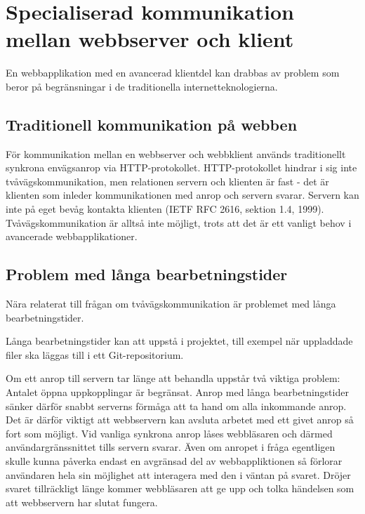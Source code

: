 \section{Specialiserad kommunikation mellan webbserver och klient}

En webbapplikation med en avancerad klientdel kan drabbas av problem som beror på begränsningar i de traditionella internetteknologierna.

\subsection{Traditionell kommunikation på webben}

För kommunikation mellan en webbserver och webbklient används traditionellt synkrona envägsanrop via HTTP-protokollet. HTTP-protokollet hindrar i sig inte tvåvägskommunikation, men relationen servern och klienten är fast - det är klienten som inleder kommunikationen med anrop och servern svarar. Servern kan inte på eget bevåg kontakta klienten (IETF RFC 2616, sektion 1.4, 1999). Tvåvägskommunikation är alltså inte möjligt, trots att det är ett vanligt behov i avancerade webbapplikationer.

\subsection{Problem med långa bearbetningstider}

Nära relaterat till frågan om tvåvägskommunikation är problemet med långa bearbetningstider.

Långa bearbetningstider kan att uppstå i projektet, till exempel när uppladdade filer ska läggas till i ett Git-repositorium. 

Om ett anrop till servern tar länge att behandla uppstår två viktiga problem:
Antalet öppna uppkopplingar är begränsat. Anrop med långa bearbetningstider sänker därför snabbt serverns förmåga att ta hand om alla inkommande anrop. Det är därför viktigt att webbservern kan avsluta arbetet med ett givet anrop så fort som möjligt. 
Vid vanliga synkrona anrop låses webbläsaren och därmed användargränssnittet tills servern svarar. Även om anropet i fråga egentligen skulle kunna påverka endast en avgränsad del av webbappliktionen så  förlorar användaren hela sin möjlighet att interagera med den i väntan på svaret. Dröjer svaret tillräckligt länge kommer webbläsaren att ge upp och tolka händelsen som att webbservern har slutat fungera.

